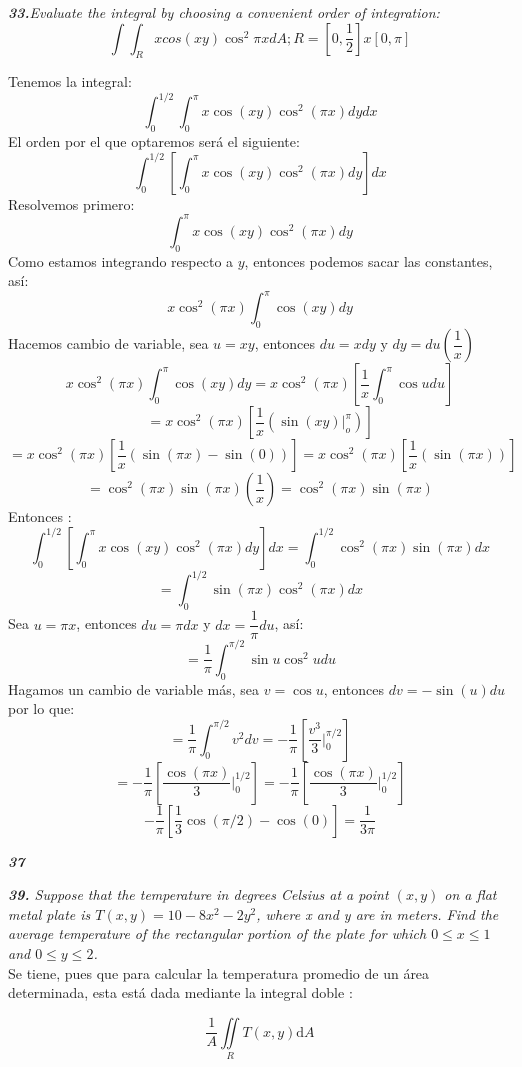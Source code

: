 \documentclass[a4paper,12pt]{article}
\begin{document}
\textit{\textbf{33.}Evaluate the integral by choosing a convenient order of integration:}
\[\int \int_{R}xcos(xy)\cos^2 \pi x dA; R = [0, \dfrac{1}{2}] x [0, \pi] \]

Tenemos la integral:
 \[\int_{0}^{1/2}\int_{0}^\pi x\cos(xy) \cos^2 (\pi x) dy dx\]
El orden por el que optaremos será el siguiente:
\[\int_{0}^{1/2} \left[ \int_{0}^{\pi} x\cos(xy) \cos^2(\pi x)dy \right] dx \]
Resolvemos primero:
\[\int_{0}^{\pi} x\cos(xy) \cos^2(\pi x)dy\]
Como estamos integrando respecto a $y$, entonces podemos sacar las constantes, así:
\[x\cos^2(\pi x)\int_{0}^{\pi} \cos(xy) dy\]
Hacemos cambio de variable, sea $u = xy$, entonces $du = x dy$ y $dy = du \left( \dfrac{1}{x} \right)$
\[x\cos^2(\pi x)\int_{0}^{\pi} \cos(xy) dy = x\cos^2(\pi x)\left[ \dfrac{1}{x} \int_{0}^{\pi}\cos u du \right] \]
\[= x\cos^2(\pi x)\left[\dfrac{1}{x}\left(\sin(xy)|_{o}^{\pi}\right) \right]\]
\[= x\cos^2(\pi x)\left[\dfrac{1}{x} \left(\sin(\pi x)- \sin(0) \right) \right]= x\cos^2(\pi x)\left[ \dfrac{1}{x} \left(\sin(\pi x)\right) \right]\]
\[= \cos^2(\pi x) \sin(\pi x) \left(\dfrac{1}{x} \right)= \cos^2(\pi x)\sin(\pi x)\]
Entonces :
\[\int_{0}^{1/2} \left[ \int_{0}^{\pi} x\cos(xy) \cos^2(\pi x)dy \right] dx = \int_{0}^{1/2}\cos^2(\pi x)\sin(\pi x) dx\]
\[=\int_{0}^{1/2}\sin(\pi x)\cos^2(\pi x) dx\]
Sea $u= \pi x$, entonces $du= \pi dx$ y $dx= \dfrac{1}{\pi}du$, así:
\[=\dfrac{1}{\pi} \int_{0}^{\pi/2}\sin u \cos^2u du\]
Hagamos un cambio de variable más, sea $v = \cos u$, entonces $dv = -\sin(u)du$ por lo que:
\[= \dfrac{1}{\pi} \int_{0}^{\pi / 2}v^2 dv = -\dfrac{1}{\pi}\left[\dfrac{v^3}{3}|_{0}^{\pi / 2}\right]\]
\[=-\dfrac{1}{\pi}\left[\dfrac{\cos(\pi x)}{3} |_{0}^{1/2}\right]= -\dfrac{1}{\pi}\left[\dfrac{\cos(\pi x)}{3}|_{0}^{1/2}\right]\]
\[-\dfrac{1}{\pi}\left[\dfrac{1}{3} \cos(\pi / 2)- \cos(0)\right]= \dfrac{1}{3\pi}\]

\textit{\textbf{37} }

	\textit{\textbf{39.} Suppose that the temperature in degrees Celsius at a
	point $(x,y)$ on a flat metal plate is $ T(x,y)=10 - 8x^2 - 2y^2$, where x
	and y are in meters. Find the average temperature of the rectangular portion
	of the plate for which $0 \leq x \leq 1$ and $0 \leq y \leq 2$.}\\

	Se tiene, pues que para calcular la temperatura promedio de un área
	determinada, esta está dada mediante la integral doble :

		$$ \frac{1}{A}  \iint\limits_{R} T(x,y)\mathrm{d}A   $$
\end{document}
